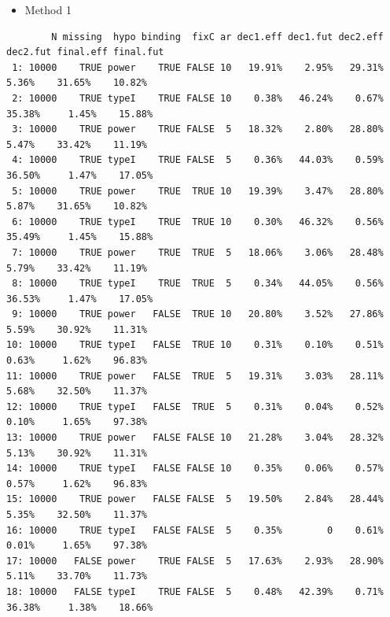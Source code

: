 \documentclass[12pt]{article}
\begin{document}
\begin{itemize}
\item Method 1
\end{itemize}
\begin{verbatim}
        N missing  hypo binding  fixC ar dec1.eff dec1.fut dec2.eff dec2.fut final.eff final.fut
 1: 10000    TRUE power    TRUE FALSE 10   19.91%    2.95%   29.31%    5.36%    31.65%    10.82%
 2: 10000    TRUE typeI    TRUE FALSE 10    0.38%   46.24%    0.67%   35.38%     1.45%    15.88%
 3: 10000    TRUE power    TRUE FALSE  5   18.32%    2.80%   28.80%    5.47%    33.42%    11.19%
 4: 10000    TRUE typeI    TRUE FALSE  5    0.36%   44.03%    0.59%   36.50%     1.47%    17.05%
 5: 10000    TRUE power    TRUE  TRUE 10   19.39%    3.47%   28.80%    5.87%    31.65%    10.82%
 6: 10000    TRUE typeI    TRUE  TRUE 10    0.30%   46.32%    0.56%   35.49%     1.45%    15.88%
 7: 10000    TRUE power    TRUE  TRUE  5   18.06%    3.06%   28.48%    5.79%    33.42%    11.19%
 8: 10000    TRUE typeI    TRUE  TRUE  5    0.34%   44.05%    0.56%   36.53%     1.47%    17.05%
 9: 10000    TRUE power   FALSE  TRUE 10   20.80%    3.52%   27.86%    5.59%    30.92%    11.31%
10: 10000    TRUE typeI   FALSE  TRUE 10    0.31%    0.10%    0.51%    0.63%     1.62%    96.83%
11: 10000    TRUE power   FALSE  TRUE  5   19.31%    3.03%   28.11%    5.68%    32.50%    11.37%
12: 10000    TRUE typeI   FALSE  TRUE  5    0.31%    0.04%    0.52%    0.10%     1.65%    97.38%
13: 10000    TRUE power   FALSE FALSE 10   21.28%    3.04%   28.32%    5.13%    30.92%    11.31%
14: 10000    TRUE typeI   FALSE FALSE 10    0.35%    0.06%    0.57%    0.57%     1.62%    96.83%
15: 10000    TRUE power   FALSE FALSE  5   19.50%    2.84%   28.44%    5.35%    32.50%    11.37%
16: 10000    TRUE typeI   FALSE FALSE  5    0.35%        0    0.61%    0.01%     1.65%    97.38%
17: 10000   FALSE power    TRUE FALSE  5   17.63%    2.93%   28.90%    5.11%    33.70%    11.73%
18: 10000   FALSE typeI    TRUE FALSE  5    0.48%   42.39%    0.71%   36.38%     1.38%    18.66%
\end{verbatim}
\end{document}
